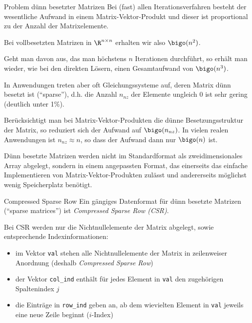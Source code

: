 \begin{bonus}{Problem dünn besetzter Matrizen}
    Bei (fast) allen Iterationsverfahren besteht der wesentliche Aufwand in einem Matrix-Vektor-Produkt und dieser ist proportional zu der Anzahl der Matrixelemente.

    Bei vollbesetzten Matrizen in $\R^{n \times n}$ erhalten wir also $\bigo(n^2)$.

    Geht man davon aus, das man höchstens $n$ Iterationen durchführt, so erhält man wieder, wie bei den direkten Lösern, einen Gesamtaufwand von $\bigo(n^3)$.

    In Anwendungen treten aber oft Gleichungssysteme auf, deren Matrix dünn besetzt ist (\enquote{sparse}), d.h. die Anzahl $n_{nz}$ der Elemente ungleich $0$ ist sehr gering (deutlich unter 1\%).

    Berücksichtigt man bei Matrix-Vektor-Produkten die dünne Besetzungsstruktur der Matrix, so reduziert sich der Aufwand auf $\bigo(n_{nz})$.
    In vielen realen Anwendungen ist $n_{nz} \approx n$, so dass der Aufwand dann nur $\bigo(n)$ ist.

    Dünn besetzte Matrizen werden nicht im Standardformat als zweidimensionales Array abgelegt, sondern in einem angepassten Format, das einerseits das einfache Implementieren von Matrix-Vektor-Produkten zulässt und andererseits möglichst wenig Speicherplatz benötigt.
\end{bonus}

\begin{defi}{Compressed Sparse Row}
    Ein gängiges Datenformat für dünn besetzte Matrizen (\enquote{sparse matrices}) ist \emph{Compressed Sparse Row (CSR)}.

    Bei CSR werden nur die Nichtnullelemente der Matrix abgelegt, sowie entsprechende Indexinformationen:
    \begin{itemize}
        \item im Vektor \texttt{val} stehen alle Nichtnullelemente der Matrix in zeilenweiser Anordnung (deshalb \emph{Compressed Sparse Row})
        \item der Vektor \texttt{col\_ind} enthält für jedes Element in \texttt{val} den zugehörigen Spaltenindex $j$
        \item die Einträge in \texttt{row\_ind} geben an, ab dem wievielten Element in \texttt{val} jeweils eine neue Zeile beginnt ($i$-Index)
    \end{itemize}
\end{defi}


